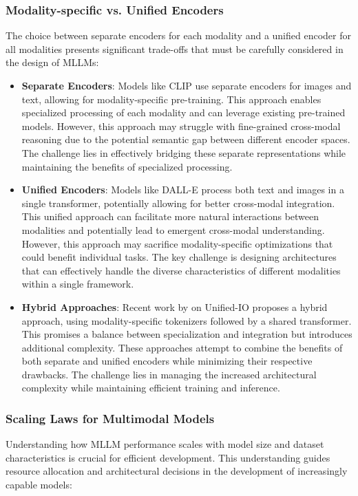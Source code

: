 \subsubsection{Modality-specific vs. Unified Encoders}
The choice between separate encoders for each modality and a unified encoder for all modalities presents significant trade-offs that must be carefully considered in the design of MLLMs:

\begin{itemize}
    \item \textbf{Separate Encoders}: Models like CLIP \citep{radford2021learning} use separate encoders for images and text, allowing for modality-specific pre-training. This approach enables specialized processing of each modality and can leverage existing pre-trained models. However, this approach may struggle with fine-grained cross-modal reasoning due to the potential semantic gap between different encoder spaces. The challenge lies in effectively bridging these separate representations while maintaining the benefits of specialized processing.
    
    \item \textbf{Unified Encoders}: Models like DALL-E \citep{ramesh2021zero} process both text and images in a single transformer, potentially allowing for better cross-modal integration. This unified approach can facilitate more natural interactions between modalities and potentially lead to emergent cross-modal understanding. However, this approach may sacrifice modality-specific optimizations that could benefit individual tasks. The key challenge is designing architectures that can effectively handle the diverse characteristics of different modalities within a single framework.
    
    \item \textbf{Hybrid Approaches}: Recent work by \citet{lu2022unified} on Unified-IO proposes a hybrid approach, using modality-specific tokenizers followed by a shared transformer. This promises a balance between specialization and integration but introduces additional complexity. These approaches attempt to combine the benefits of both separate and unified encoders while minimizing their respective drawbacks. The challenge lies in managing the increased architectural complexity while maintaining efficient training and inference.
\end{itemize}

\subsubsection{Scaling Laws for Multimodal Models}
Understanding how MLLM performance scales with model size and dataset characteristics is crucial for efficient development. This understanding guides resource allocation and architectural decisions in the development of increasingly capable models:

